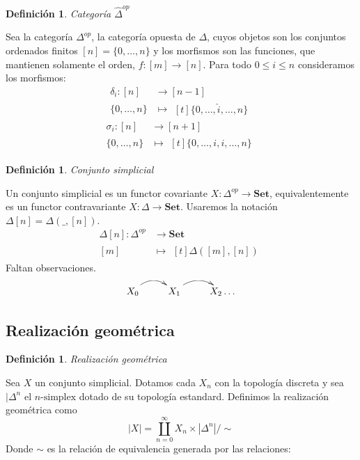 \documentclass[11pt,a4paper,openright,oneside]{article}
\numberwithin{equation}{section}
\newtheorem{defi}[teo]{Definici\'on}
\theoremstyle{definition}
\begin{document}
\begin{defi}
    Categor\'ia $\hat{\Delta}^{op}$
\end{defi}
Sea la categor\'ia $\Delta^{op}$, la categor\'ia opuesta de $\Delta$, cuyos objetos son los conjuntos ordenados finitos $[n] = \{0,\dots,n\}$ y los morfismos son las funciones, que mantienen solamente el orden, $f: [m] \longrightarrow [n]$.
Para todo $0\le i \le n$ consideramos los morfismos:
\begin{align*}
    \delta_i: [n] & \longrightarrow [n-1] \\
    \{0,\dots,n\} & \longmapsto\!
    \begin{aligned}[t]
        \{0,\dots, \hat{i}, \dots,n\}
    \end{aligned}
\end{align*}
\begin{align*}
    \sigma_i: [n] & \longrightarrow [n+1] \\
    \{0,\dots,n\} & \longmapsto\!
    \begin{aligned}[t]
        \{0,\dots, i,i, \dots,n\}
    \end{aligned}
\end{align*}

\begin{defi}
    Conjunto simplicial
\end{defi}
Un conjunto simplicial es un functor covariante $X: \Delta^{op} \longrightarrow \mathbf{Set}$, equivalentemente es un functor contravariante $X: \Delta \longrightarrow \mathbf{Set}$.
Usaremos la notaci\'on $\Delta[n]=\Delta(\_,[n])$.
\begin{align*}
    \Delta[n]: \Delta^{op} & \longrightarrow \mathbf{Set} \\
    [m] & \longmapsto\!
    \begin{aligned}[t]
        \Delta([m],[n])
    \end{aligned}
\end{align*}
Faltan observaciones.

$$ %
    \xymatrix{
    X_0  \ar@/{}^{1pc}/[r]  & X_1  \ar@/{}^{1pc}/[r] & X_2  \dots
    }
$$

\subsection{Realizaci\'on geom\'etrica}
\begin{defi}
    Realizaci\'on geom\'etrica
\end{defi}
Sea $X$ un conjunto simplicial. Dotamos cada $X_n$ con la topolog\'ia discreta y sea $|\Delta^n$ el $n\text{-simplex}$ dotado de su topolog\'ia estandard. Definimos la realizaci\'on geom\'etrica como
$$
    |X| = \coprod_{n=0}^{\infty}X_n \times |\Delta^n| / \sim
$$
Donde $\sim$ es la relaci\'on de equivalencia generada por las relaciones:
\end{document}
